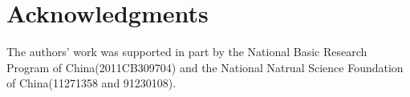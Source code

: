 \documentclass{eajam}
\begin{document}
\section*{Acknowledgments}
The authors' work was supported in part by the National Basic Research
Program of China(2011CB309704) and the National Natrual Science
Foundation of China(11271358 and 91230108).
   


\end{document}
